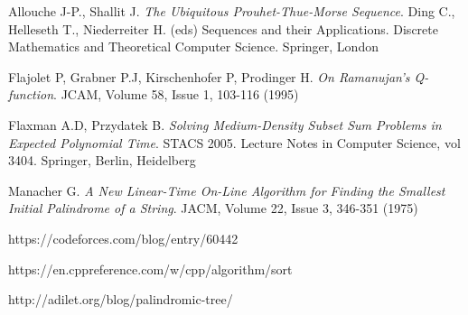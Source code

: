 \begin{thebibliography}{}
 Allouche J-P., Shallit J. \textit{The Ubiquitous Prouhet-Thue-Morse Sequence}. Ding C., Helleseth T., Niederreiter H. (eds) Sequences and their Applications. Discrete Mathematics and Theoretical Computer Science. Springer, London

\newpage

 Flajolet P, Grabner P.J, Kirschenhofer P, Prodinger H. \textit{On Ramanujan's Q-function}. JCAM, Volume 58, Issue 1, 103-116 (1995)

 Flaxman A.D, Przydatek B. \textit{Solving Medium-Density Subset Sum Problems
in Expected Polynomial Time}. STACS 2005. Lecture Notes in Computer Science, vol 3404. Springer, Berlin, Heidelberg

 Manacher G. \textit{A New Linear-Time On-Line Algorithm for Finding the Smallest Initial Palindrome of a String}. JACM, Volume 22, Issue 3, 346-351 (1975)

 https://codeforces.com/blog/entry/60442

 https://en.cppreference.com/w/cpp/algorithm/sort

 http://adilet.org/blog/palindromic-tree/

\end{thebibliography}

